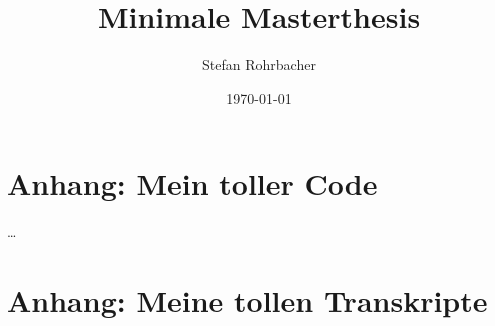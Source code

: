 \documentclass[a4paper]{article}
\title{Minimale Masterthesis}
\author{Stefan Rohrbacher}
\date{\today}
\begin{document}


\addtocounter{page}{-1} %

\newpage
\tableofcontents
\newpage
\listoffigures
\newpage
\listoftables
\newpage










\printbibliography
\newpage

\begin{appendix}
	\section{Anhang: Mein toller Code}
	\ldots
	\newpage
	\section{Anhang: Meine tollen Transkripte}
\end{appendix}
\end{document}
